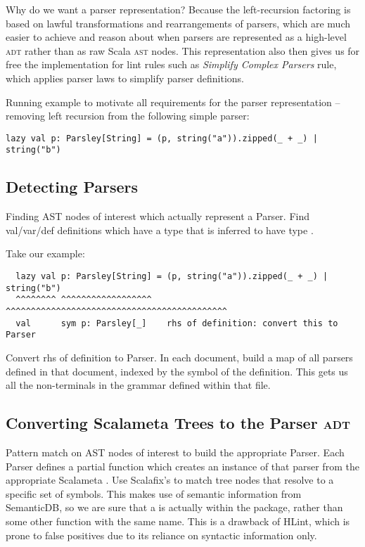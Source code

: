 \documentclass[../../main.tex]{subfiles}
\begin{document}
Why do we want a parser representation? Because the left-recursion factoring is based on lawful transformations and rearrangements of parsers,
which are much easier to achieve and reason about when parsers are represented as a high-level \textsc{adt} rather than as raw Scala \textsc{ast} nodes.
This representation also then gives us for free the implementation for lint rules such as \emph{Simplify Complex Parsers} rule, which applies parser laws to simplify parser definitions.

Running example to motivate all requirements for the parser representation -- removing left recursion from the following simple parser:
\begin{verbatim}
lazy val p: Parsley[String] = (p, string("a")).zipped(_ + _) | string("b")
\end{verbatim}

\subsection{Detecting Parsers} %
Finding AST nodes of interest which actually represent a Parser.
Find val/var/def definitions which have a type that is inferred to have type .

Take our example:
\begin{verbatim}
  lazy val p: Parsley[String] = (p, string("a")).zipped(_ + _) | string("b")
  ^^^^^^^^ ^^^^^^^^^^^^^^^^^^   ^^^^^^^^^^^^^^^^^^^^^^^^^^^^^^^^^^^^^^^^^^^^
  val      sym p: Parsley[_]    rhs of definition: convert this to Parser
\end{verbatim}
Convert rhs of definition to Parser.
In each document, build a map of all parsers defined in that document, indexed by the symbol of the definition.
This gets us all the non-terminals in the grammar defined within that file.

\subsection{Converting Scalameta Trees to the Parser \textsc{adt}}
Pattern match on AST nodes of interest to build the appropriate Parser.
Each Parser defines a partial function \scala{fromTerm} which creates an instance of that parser from the appropriate Scalameta .
Use Scalafix's \scala{SymbolMatcher} to match tree nodes that resolve to a specific set of symbols.
This makes use of semantic information from SemanticDB, so we are sure that a \scala{<*>} is actually within the  package, rather than some other function with the same name.
This is a drawback of HLint, which is prone to false positives due to its reliance on syntactic information only.
\end{document}

